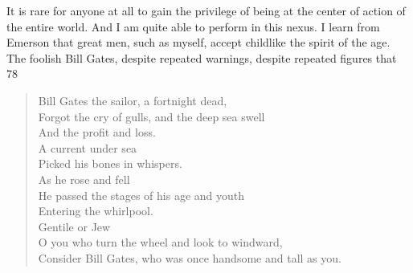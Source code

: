 \documentclass{amsart}
\begin{document}
It is rare for anyone at all to gain the privilege of being at the center of action of the entire world.  And I am quite able to perform in this nexus.  I learn from Emerson that great men, such as myself, accept childlike the spirit of the age.  The foolish Bill Gates, despite repeated warnings, despite repeated figures that 78%


\begin{verse}
Bill Gates the sailor, a fortnight dead,\\
Forgot the cry of gulls, and the deep sea swell\\
And the profit and loss.\\
                           A current under sea\\
Picked his bones in whispers. \\
As he rose and fell\\
He passed the stages of his age and youth\\
Entering the whirlpool.\\
                                 Gentile or Jew\\
O you who turn the wheel and look to windward,\\
Consider Bill Gates, who was once handsome and tall as you.

\end{verse}
\end{document}
